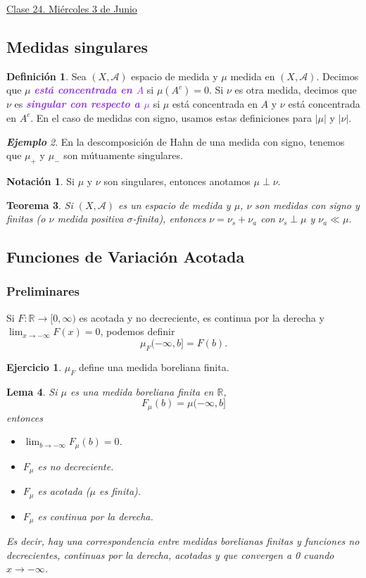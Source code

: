 \documentclass{article}
\newtheorem{theorem}{Teorema}[subsection]
\newtheorem{lemma}[theorem]{Lema}
\theoremstyle{definition}
\newtheorem{definition}[theorem]{Definición}
\newtheorem{exercise}{Ejercicio}
\newtheorem*{notation}{Notación}
\theoremstyle{remark}
\newtheorem{example}[theorem]{\textbf{Ejemplo}}
\numberwithin{equation}{section}
\newcommand{\A}{\mathcal{A}}
\newcommand{\R}{\mathbb{R}}
\newcommand{\oo}{\infty}
\newcommand{\abs}[1]{\left| #1 \right|}
\newcommand{\wea}[1]{\textcolor{BlueViolet}{\textbf{\emph{#1}}}}
\newcommand{\fecha}[1]{\begin{flushright} \underline{#1} \end{flushright}}
\begin{document}
\newpage
\fecha{Clase 24. Miércoles 3 de Junio}
\subsection{Medidas singulares}

\begin{definition}
  Sea $(X,\A)$ espacio de medida y $\mu$ medida en $(X,\A)$. Decimos que $\mu$ \wea{está concentrada en $A$} si $\mu(A^c) = 0$. Si $\nu$ es otra medida, decimos que $\nu$ es \wea{singular con respecto a $\mu$} si $\mu$ está concentrada en $A$ y $\nu$ está concentrada en $A^c$.
  En el caso de medidas con signo, usamos estas definiciones para $\abs\mu$ y $\abs\nu$.
\end{definition}

\begin{example}
  En la descomposición de Hahn de una medida con signo, tenemos que $\mu_+$ y $\mu_-$ son mútuamente singulares.
\end{example}

\begin{notation}
  Si $\mu$ y $\nu$ son singulares, entonces anotamos $\mu \perp \nu$.
\end{notation}

\begin{theorem}
  Si $(X,\A)$ es un espacio de medida y $\mu$, $\nu$ son medidas con signo y finitas (o $\nu$ medida positiva $\sigma$-finita), entonces $\nu = \nu_s + \nu_a$ con $\nu_s \perp \mu$ y $\nu_a \ll \mu$.
\end{theorem}
\newpage
\subsection{Funciones de Variación Acotada}

\subsubsection{Preliminares}

Si $F \colon \R \to [0,\oo)$ es acotada y no decreciente, es continua por la derecha y $\lim_{x \to -\oo} F(x) = 0$, podemos definir
\[ \mu_F(-\oo,b] = F(b). \]

\begin{exercise}
  $\mu_F$ define una medida boreliana finita.
\end{exercise}

\begin{lemma}
  Si $\mu$ es una medida boreliana finita en $\R$,
  \[ F_\mu(b) = \mu(-\oo,b] \]
  entonces
  \begin{itemize}
    \item $\lim_{b\to-\oo} F_\mu(b) = 0$.
    \item $F_\mu$ es no decreciente.
    \item $F_\mu$ es acotada ($\mu$ es finita).
    \item $F_\mu$ es continua por la derecha.
  \end{itemize}
  Es decir, hay una correspondencia entre medidas borelianas finitas y funciones no decrecientes, continuas por la derecha, acotadas y que convergen a 0 cuando $x \to -\oo$.
\end{lemma}
\end{document}
